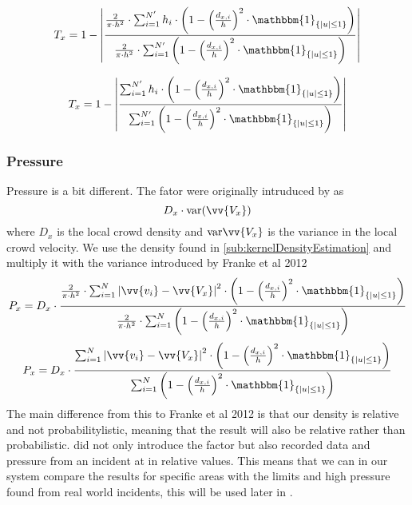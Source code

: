 \begin{equation}
\label{eq:}
T_x = 1 - \left|\frac{\frac{2}{\pi \cdot h^2} \cdot \sum_{i=1}^{N'} h_i \cdot \left(1-\left(\frac{d_{x,i}}{h}\right)^2 \cdot \mathbbm{1}_{\{|u| \leq 1\} }\right)}{\frac{2}{\pi \cdot h^2} \cdot \sum_{i=1}^{N'} \left(1-\left(\frac{d_{x,i}}{h}\right)^2 \cdot \mathbbm{1}_{\{|u| \leq 1\} }\right)}\right|
\end{equation}

\begin{equation}
\label{eq:}
T_x = 1 - \left|\frac{\sum_{i=1}^{N'} h_i \cdot \left(1-\left(\frac{d_{x,i}}{h}\right)^2 \cdot \mathbbm{1}_{\{|u| \leq 1\} }\right)}{\sum_{i=1}^{N'} \left(1-\left(\frac{d_{x,i}}{h}\right)^2 \cdot \mathbbm{1}_{\{|u| \leq 1\} }\right)}\right|
\end{equation}

\subsubsection{Pressure}
Pressure is a bit different. The fator were originally intruduced by \citet{empircalstudy} as 
\begin{equation}
D_x \cdot \text{var}(\vv{V_x})
\end{equation}
where $D_x$ is the local crowd density and $\text{var}\vv{V_x}$ is the variance in the local crowd velocity. We use the density found in \cref{sub:kernelDensityEstimation} and multiply it with the variance introduced by Franke et al 2012 \cite{wirz2012inferring}
\begin{equation}
\label{eq:}
P_x = D_x \cdot \frac{\frac{2}{\pi \cdot h^2} \cdot \sum_{i=1}^{N} \left|\vv{v_i} - \vv{V_x}\right|^2 \cdot \left(1-\left(\frac{d_{x,i}}{h}\right)^2 \cdot \mathbbm{1}_{\{|u| \leq 1\} }\right)}{\frac{2}{\pi \cdot h^2} \cdot \sum_{i=1}^{N} \left(1-\left(\frac{d_{x,i}}{h}\right)^2 \cdot \mathbbm{1}_{\{|u| \leq 1\} }\right)}
\end{equation}
\begin{equation}
\label{eq:}
P_x = D_x \cdot \frac{\sum_{i=1}^{N} \left|\vv{v_i} - \vv{V_x}\right|^2 \cdot \left(1-\left(\frac{d_{x,i}}{h}\right)^2 \cdot \mathbbm{1}_{\{|u| \leq 1\} }\right)}{\sum_{i=1}^{N} \left(1-\left(\frac{d_{x,i}}{h}\right)^2 \cdot \mathbbm{1}_{\{|u| \leq 1\} }\right)}
\end{equation}
The main difference from this to Franke et al 2012 is that our density is relative and not probabilitylistic, meaning that the result will also be relative rather than probabilistic.  did not only introduce the factor but also recorded data and pressure from an incident at  in relative values. This means that we can in our system compare the results for specific areas with the limits and high pressure found from real world incidents, this will be used later in .